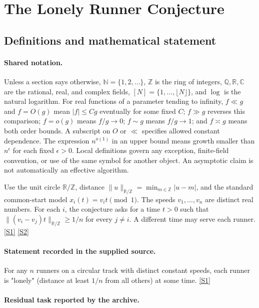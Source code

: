 \documentclass[11pt,a4paper]{article}
\newcommand{\N}{\mathbb{N}}
\newcommand{\Z}{\mathbb{Z}}
\newcommand{\Q}{\mathbb{Q}}
\newcommand{\R}{\mathbb{R}}
\newcommand{\C}{\mathbb{C}}
\newcommand{\sref}[2]{\hyperlink{source:#1:#2}{[S#2]}}
\begin{document}
\section{The Lonely Runner Conjecture}\label{statement}


\subsection{Definitions and mathematical statement}

\paragraph{Shared notation.}Unless a section says otherwise, $\N=\{1,2,\ldots\}$,
$\Z$ is the ring of integers, $\Q,\R,\C$ are the rational, real, and complex
fields, $[N]=\{1,\ldots,\lfloor N\rfloor\}$, and $\log$ is the natural
logarithm. For real functions of a parameter tending to infinity,
$f\ll g$ and $f=O(g)$ mean $|f|\leq Cg$ eventually for some fixed $C$;
$f\gg g$ reverses this comparison; $f=o(g)$ means $f/g\to0$;
$f\sim g$ means $f/g\to1$; and $f\asymp g$ means both order bounds.
A subscript on $O$ or $\ll$ specifies allowed constant dependence.
The expression $n^{o(1)}$ in an upper bound means growth smaller than
$n^\epsilon$ for each fixed $\epsilon>0$. Local definitions govern any
exception, finite-field convention, or use of the same symbol for another
object. An asymptotic claim is not automatically an effective algorithm.



Use the unit circle $\R/\Z$, distance $\|u\|_{\R/\Z}=\min_{m\in\Z}|u-m|$, and the standard common-start model $x_i(t)=v_it\pmod1$. The speeds $v_1,\ldots,v_n$ are distinct real numbers. For each $i$, the conjecture asks for a time $t>0$ such that $\|(v_i-v_j)t\|_{\R/\Z}\geq1/n$ for every $j\ne i$. A different time may serve each runner. \sref{statement}{1} \sref{statement}{2}

\paragraph{Statement recorded in the supplied source.}
For any $n$ runners on a circular track with distinct constant speeds, each runner is "lonely" (distance at least $1/n$ from all others) at some time. \sref{statement}{1}

\paragraph{Residual task reported by the archive.}
\end{document}
